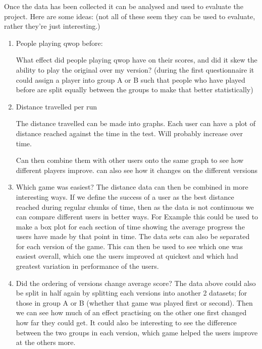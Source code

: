 \documentclass[12pt,a4paper,twoside]{article}
\begin{document}
Once the data has been collected it can be analysed and used to evaluate the project. Here are some ideas: (not all of these seem they can be used to evaluate, rather they're just interesting.)
\begin{enumerate}
	\item People playing qwop before:

	What effect did people playing qwop have on their scores, and did it skew the ability to play the original over my version? (during the first questionnaire it could assign a player into group A or B such that people who have played before are split equally between the groups to make that better statistically)
	\item Distance travelled per run

	The distance travelled can be made into graphs.
	Each user can have a plot of distance reached against the time in the test.
	Will probably increase over time.

	Can then combine them with other users onto the same graph to see how different players improve. can also see how it changes on the different versions

	\item Which game was easiest?
	The distance data can then be combined in more interesting ways. If we define the success of a user as the best distance reached during regular chunks of time, then as the data is not continuous we can compare different users in better ways. For Example this could be used to make a box plot for each section of time showing the average progress the users have made by that point in time. The data sets can also be separated for each version of the game. This can then be used to see which one was easiest overall, which one the users improved at quickest and which had greatest variation in performance of the users.

	\item Did the ordering of versions change average score?
	The data above could also be split in half again by splitting each versions into another 2 datasets; for those in group A or B (whether that game was played first or second). Then we can see how much of an effect practising on the other one first changed how far they could get.
	It could also be interesting to see the difference between the two groups in each version, which game helped the users improve at the others more.

\end{enumerate}


\end{document}
